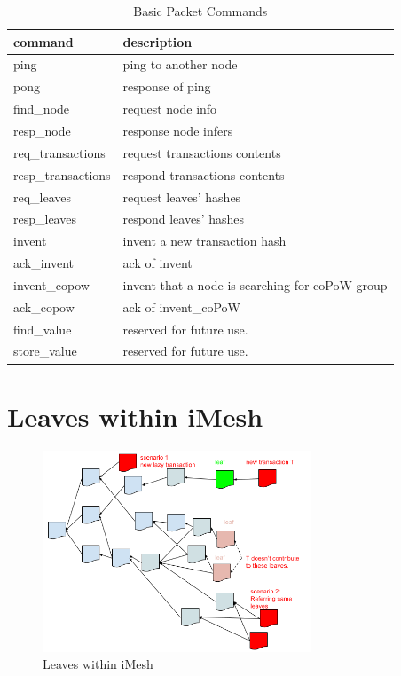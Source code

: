 \documentclass[a4paper,10pt,twocolumn]{article}
\begin{document}
 \begin{table}[htb]
	\caption{Basic Packet Commands}
    \label{tbl:cmd}
	\begin{tabularx}{\linewidth}{XX} 
		command & description \\
		\toprule
  ping & ping to another node \\
  pong & response of ping \\
  find\_node & request node info\\
    resp\_node & response node infers \\
  req\_transactions & request transactions contents \\
  resp\_transactions & respond transactions contents \\
  req\_leaves & request  leaves' hashes \\
  resp\_leaves &  respond leaves' hashes \\
  invent &  invent a new transaction hash \\
  ack\_invent & ack of invent \\
  invent\_copow & invent that a node is searching for coPoW group \\
  ack\_copow & ack of invent\_coPoW \\
  find\_value &  reserved for future use.\\
  store\_value & reserved for future use.\\
  \bottomrule
\end{tabularx}
  \end{table}

\section{Leaves within iMesh}
\label{sec:leaves}

\begin{figure}[ht]
	\begin{center}
	\includegraphics[width=80mm]{leaves.png}
	  \caption{Leaves within iMesh}
    \label{fig:leaves}
	\end{center}
 \end{figure}
\end{document}
